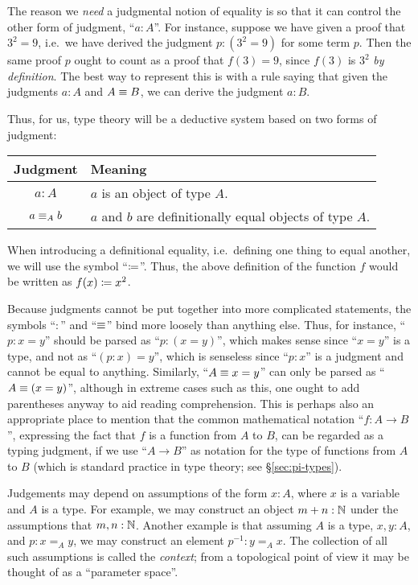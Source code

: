 The reason we \emph{need} a judgmental notion of equality is so that it can control the other form of judgment, ``$a:A$''.
For instance, suppose we have given a proof that $3^2=9$, i.e.\ we have derived the judgment $p:(3^2=9)$ for some term $p$.
Then the same proof $p$ ought to count as a proof that $f(3)=9$, since $f(3)$ is $3^2$ \emph{by definition}.
The best way to represent this is with a rule saying that given the judgments $a:A$ and $A\equiv B$, we can derive the judgment $a:B$.

Thus, for us, type theory will be a deductive system based on two forms of judgment:
\begin{center}
\begin{tabular}{c|l}
  \textbf{Judgment} & \textbf{Meaning}\\\hline
  $a : A$ & $a$ is an object of type $A$.\\
  $a \equiv_A b$ & $a$ and $b$ are definitionally equal objects of type $A$.
\end{tabular}
\end{center}
When introducing a definitional equality, i.e.\ defining one thing to equal another, we will use the symbol ``$\coloneqq$''.
Thus, the above definition of the function $f$ would be written as $f(x)\coloneqq x^2$.

Because judgments cannot be put together into more complicated statements, the symbols ``$:$'' and ``$\equiv$'' bind more loosely than anything else.
Thus, for instance, ``$p:x=y$'' should be parsed as ``$p:(x=y)$'', which makes sense since ``$x=y$'' is a type, and not as ``$(p:x)=y$'', which is senseless since ``$p:x$'' is a judgment and cannot be equal to anything.
Similarly, ``$A\equiv x=y$'' can only be parsed as ``$A\equiv(x=y)$'', although in extreme cases such as this, one ought to add parentheses anyway to aid reading comprehension.
This is perhaps also an appropriate place to mention that the common mathematical notation ``$f:A\to B$'', expressing the fact that $f$ is a function from $A$ to $B$, can be regarded as a typing judgment, if we use ``$A\to B$'' as notation for the type of functions from $A$ to $B$ (which is standard practice in type theory; see \S\ref{sec:pi-types}).

Judgements may depend on assumptions of the form $x:A$, where $x$ is a variable and $A$ is a type.
For example, we may construct an object $m + n : \mathbb{N}$ under the assumptions that $m,n : \mathbb{N}$.
Another example is that assuming $A$ is a type, $x,y : A$, and $p : x =_A y$, we may construct an element $p^{-1} : y =_A x$.
The collection of all such assumptions is called the \emph{context}; from a topological point of view it may be thought of as a ``parameter space''.

